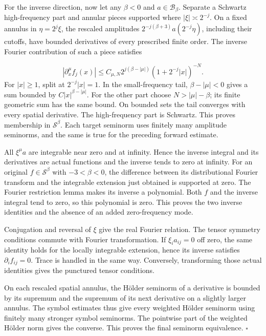 \documentclass[
  english,
  11pt,
  reqno]{amsart}
\begin{document}
For the inverse direction, now let any \(\beta<0\) and
\(a\in\mathscr B_\beta\). Separate a Schwartz high-frequency part and
annular pieces supported where \(|\xi|\asymp2^{-j}\). On a fixed annulus
in \(\eta=2^j\xi\), the rescaled amplitudes
\(2^{-j(\beta+3)}a(2^{-j}\eta)\), including their cutoffs, have bounded
derivatives of every prescribed finite order. The inverse Fourier
contribution of such a piece satisfies

\label{eq:online-root-inverse-annular-estimate} \[
|\partial_x^\mu f_j(x)|
\le C_{\mu,N}2^{j(\beta-|\mu|)}
(1+2^{-j}|x|)^{-N}.
\] For \(|x|\ge1\), split at \(2^{-j}|x|=1\). In the small-frequency
tail, \(\beta-|\mu|<0\) gives a sum bounded by \(C|x|^{\beta-|\mu|}\).
For the other part choose \(N>|\mu|-\beta\); its finite geometric sum
has the same bound. On bounded sets the tail converges with every
spatial derivative. The high-frequency part is Schwartz. This proves
membership in \(\mathscr S^\beta\). Each target seminorm uses finitely
many amplitude seminorms, and the same is true for the preceding forward
estimate.

All \(\xi^\mu a\) are integrable near zero and at infinity. Hence the
inverse integral and its derivatives are actual functions and the
inverse tends to zero at infinity. For an original
\(f\in\mathscr S^\beta\) with \(-3<\beta<0\), the difference between its
distributional Fourier transform and the integrable extension just
obtained is supported at zero. The Fourier restriction lemma makes its
inverse a polynomial. Both \(f\) and the inverse integral tend to zero,
so this polynomial is zero. This proves the two inverse identities and
the absence of an added zero-frequency mode.

Conjugation and reversal of \(\xi\) give the real Fourier relation. The
tensor symmetry conditions commute with Fourier transformation. If
\(\xi_i a_{ij}=0\) off zero, the same identity holds for the locally
integrable extension, hence its inverse satisfies
\(\partial_i f_{ij}=0\). Trace is handled in the same way. Conversely,
transforming those actual identities gives the punctured tensor
conditions.

On each rescaled spatial annulus, the Hölder seminorm of a derivative is
bounded by its supremum and the supremum of its next derivative on a
slightly larger annulus. The symbol estimates thus give every weighted
Hölder seminorm using finitely many stronger symbol seminorms. The
pointwise part of the weighted Hölder norm gives the converse. This
proves the final seminorm equivalence. \hfill\(\square\)
\end{document}
